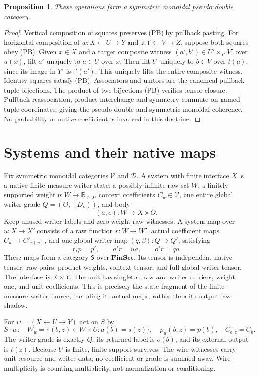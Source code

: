 \documentclass{article}
\newtheorem{proposition}[theorem]{Proposition}
\newcommand{\Fin}{\mathbf{FinSet}}
\begin{document}
\begin{proposition}
These operations form a symmetric monoidal pseudo double category.
\end{proposition}
\begin{proof}
Vertical composition of squares preserves (PB) by pullback pasting. For horizontal composition of $w:X\leftarrow U\to Y$ and $z:Y\leftarrow V\to Z$, suppose both squares obey (PB). Given $x\in X$ and a target composite witness $(a',b')\in U'\times_{Y'}V'$ over $u(x)$, lift $a'$ uniquely to $a\in U$ over $x$. Then lift $b'$ uniquely to $b\in V$ over $t(a)$, since its image in $Y'$ is $t'(a')$. This uniquely lifts the entire composite witness. Identity squares satisfy (PB). Associators and unitors are the canonical pullback tuple bijections. The product of two bijections (PB) verifies tensor closure. Pullback reassociation, product interchange and symmetry commute on named tuple coordinates, giving the pseudo-double and symmetric-monoidal coherence. No probability or native coefficient is involved in this doctrine.
\end{proof}

\section{Systems and their native maps}
Fix symmetric monoidal categories $\mathcal V$ and $\mathcal D$. A system with finite interface $X$ is a native finite-measure writer state: a possibly infinite raw set $W$, a finitely supported weight $p:W\to\mathbb R_{\ge0}$, context coefficients $C_w\in\mathcal V$, one entire global writer grade $Q=(O,(D_o))$, and body
\[(a,o):W\to X\times O.\]
Keep unused writer labels and zero-weight raw witnesses. A system map over $u:X\to X'$ consists of a raw function $r:W\to W'$, actual coefficient maps $C_w\to C'_{r(w)}$, and one global writer map $(q,\beta):Q\to Q'$, satisfying
\[r_*p=p',\qquad a'r=ua,\qquad o'r=qo.\]
These maps form a category $\mathsf S$ over $\Fin$. Its tensor is independent native tensor: raw pairs, product weights, context tensor, and full global writer tensor. The interface is $X\times Y$. The unit has singleton raw and writer carriers, weight one, and unit coefficients. This is precisely the state fragment of the finite-measure writer source, including its actual maps, rather than its output-law shadow.

For $w=(X\leftarrow U\to Y)$ act on $S$ by
\[S\cdot w:\quad W_w=\{(b,z)\in W\times U:a(b)=s(z)\},\quad p_w(b,z)=p(b),\quad C_{b,z}=C_b.\tag{A}\]
The writer grade is exactly $Q$, its returned label is $o(b)$, and its external output is $t(z)$. Because $U$ is finite, finite support survives. The wire witnesses carry unit resource and writer data; no coefficient or grade is summed away. Wire multiplicity is counting multiplicity, not normalization or conditioning.
\end{document}
